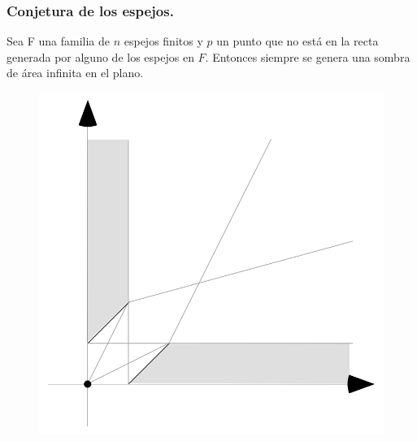 \begin{frame}
  \frametitle{Conjetura de los espejos.}
  \begin{conjetura}
    Sea F una familia de $n$ espejos finitos y $p$ un punto que no
    está en la recta generada por alguno de los espejos en $F$. Entonces siempre
    se genera una sombra de área infinita en el plano.
  \end{conjetura}
  \begin{figure}
    \centering
    \includegraphics[width=.25 \paperwidth]{./images/Espejos.png}
  \end{figure}
\end{frame}

